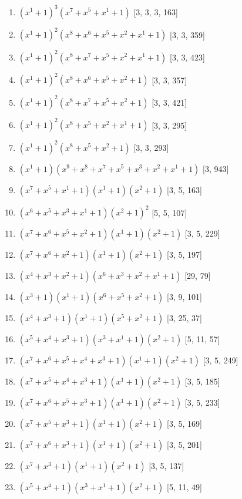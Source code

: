 \documentclass[10pt,twocolumn]{article}
\begin{document}
\begin{enumerate}
\item $(x^{1} + 1)^{3}(x^{7} + x^{5} + x^{1} + 1)$  [3, 3, 3, 163]
\item $(x^{1} + 1)^{2}(x^{8} + x^{6} + x^{5} + x^{2} + x^{1} + 1)$  [3, 3, 359]
\item $(x^{1} + 1)^{2}(x^{8} + x^{7} + x^{5} + x^{2} + x^{1} + 1)$  [3, 3, 423]
\item $(x^{1} + 1)^{2}(x^{8} + x^{6} + x^{5} + x^{2} + 1)$  [3, 3, 357]
\item $(x^{1} + 1)^{2}(x^{8} + x^{7} + x^{5} + x^{2} + 1)$  [3, 3, 421]
\item $(x^{1} + 1)^{2}(x^{8} + x^{5} + x^{2} + x^{1} + 1)$  [3, 3, 295]
\item $(x^{1} + 1)^{2}(x^{8} + x^{5} + x^{2} + 1)$  [3, 3, 293]
\item $(x^{1} + 1)(x^{9} + x^{8} + x^{7} + x^{5} + x^{3} + x^{2} + x^{1} + 1)$  [3, 943]
\item $(x^{7} + x^{5} + x^{1} + 1)(x^{1} + 1)(x^{2} + 1)$  [3, 5, 163]
\item $(x^{6} + x^{5} + x^{3} + x^{1} + 1)(x^{2} + 1)^{2}$  [5, 5, 107]
\item $(x^{7} + x^{6} + x^{5} + x^{2} + 1)(x^{1} + 1)(x^{2} + 1)$  [3, 5, 229]
\item $(x^{7} + x^{6} + x^{2} + 1)(x^{1} + 1)(x^{2} + 1)$  [3, 5, 197]
\item $(x^{4} + x^{3} + x^{2} + 1)(x^{6} + x^{3} + x^{2} + x^{1} + 1)$  [29, 79]
\item $(x^{3} + 1)(x^{1} + 1)(x^{6} + x^{5} + x^{2} + 1)$  [3, 9, 101]
\item $(x^{4} + x^{3} + 1)(x^{1} + 1)(x^{5} + x^{2} + 1)$  [3, 25, 37]
\item $(x^{5} + x^{4} + x^{3} + 1)(x^{3} + x^{1} + 1)(x^{2} + 1)$  [5, 11, 57]
\item $(x^{7} + x^{6} + x^{5} + x^{4} + x^{3} + 1)(x^{1} + 1)(x^{2} + 1)$  [3, 5, 249]
\item $(x^{7} + x^{5} + x^{4} + x^{3} + 1)(x^{1} + 1)(x^{2} + 1)$  [3, 5, 185]
\item $(x^{7} + x^{6} + x^{5} + x^{3} + 1)(x^{1} + 1)(x^{2} + 1)$  [3, 5, 233]
\item $(x^{7} + x^{5} + x^{3} + 1)(x^{1} + 1)(x^{2} + 1)$  [3, 5, 169]
\item $(x^{7} + x^{6} + x^{3} + 1)(x^{1} + 1)(x^{2} + 1)$  [3, 5, 201]
\item $(x^{7} + x^{3} + 1)(x^{1} + 1)(x^{2} + 1)$  [3, 5, 137]
\item $(x^{5} + x^{4} + 1)(x^{3} + x^{1} + 1)(x^{2} + 1)$  [5, 11, 49]

\end{enumerate}
\end{document}
